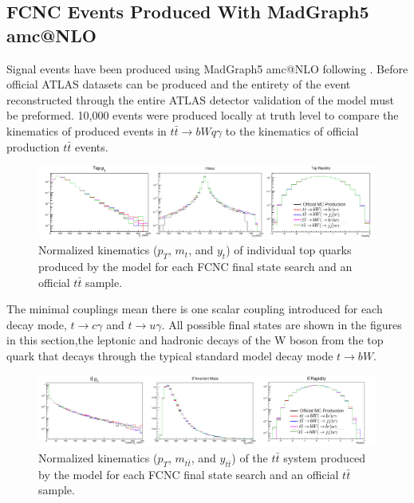\subsection{FCNC Events Produced With MadGraph5 amc@NLO}

Signal events have been produced using MadGraph5 amc@NLO following \cite{Degrande:2014tta}.  Before official ATLAS datasets can be produced and the entirety of the event reconstructed through the entire ATLAS detector validation of the model must be preformed.  10,000 events were produced locally at truth level to compare the kinematics of produced events in $t\bar{t}\rightarrow bWq\gamma$ to the kinematics of official production $t\bar{t}$ events. 

\begin{figure}[h!]
	\centering
	\includegraphics[width=\columnwidth]{../ThesisImages/FCNCValidation/singleTops.png}
	\caption{ Normalized kinematics ($p_T$, $m_t$, and $y_t$) of individual top quarks produced by the model for each FCNC final state search and an official $t\bar{t}$ sample.
	}
\end{figure}


The minimal couplings mean there is one scalar coupling introduced for each decay mode, $t\rightarrow c\gamma$ and $t\rightarrow u\gamma$.  All possible final states are shown in the figures in this section,the leptonic and hadronic decays of the W boson from the top quark that decays through the typical standard model decay mode $t\rightarrow bW$. 

\begin{figure}[h!]
	\centering
	\includegraphics[width=\columnwidth]{../ThesisImages/FCNCValidation/ttBarSys.png}
	\caption{Normalized kinematics ($p_T$, $m_{t\bar{t}}$, and $y_{t\bar{t}}$) of the $t\bar{t}$ system produced by the model for each FCNC final state search and an official $t\bar{t}$ sample.
	}
\end{figure}

